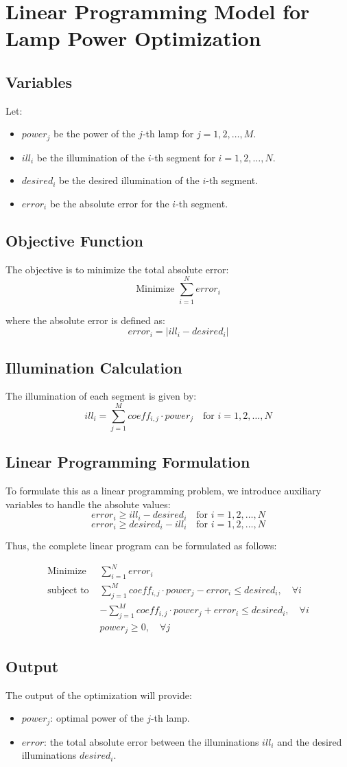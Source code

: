 \documentclass{article}
\begin{document}
\section*{Linear Programming Model for Lamp Power Optimization}

\subsection*{Variables}
Let:
\begin{itemize}
    \item $power_j$ be the power of the $j$-th lamp for $j = 1, 2, \ldots, M$.
    \item $ill_i$ be the illumination of the $i$-th segment for $i = 1, 2, \ldots, N$.
    \item $desired_i$ be the desired illumination of the $i$-th segment.
    \item $error_i$ be the absolute error for the $i$-th segment.
\end{itemize}

\subsection*{Objective Function}
The objective is to minimize the total absolute error:
\[
\text{Minimize } \sum_{i=1}^{N} error_i
\]

where the absolute error is defined as:
\[
error_i = |ill_i - desired_i|
\]

\subsection*{Illumination Calculation}
The illumination of each segment is given by:
\[
ill_i = \sum_{j=1}^{M} coeff_{i,j} \cdot power_j \quad \text{for } i = 1, 2, \ldots, N
\]

\subsection*{Linear Programming Formulation}
To formulate this as a linear programming problem, we introduce auxiliary variables to handle the absolute values:
\[
error_i \geq ill_i - desired_i \quad \text{for } i = 1, 2, \ldots, N
\]
\[
error_i \geq desired_i - ill_i \quad \text{for } i = 1, 2, \ldots, N
\]

Thus, the complete linear program can be formulated as follows:

\begin{align*}
\text{Minimize } & \sum_{i=1}^{N} error_i \\
\text{subject to } & \sum_{j=1}^{M} coeff_{i,j} \cdot power_j - error_i \leq desired_i, \quad \forall i \\
& -\sum_{j=1}^{M} coeff_{i,j} \cdot power_j + error_i \leq desired_i, \quad \forall i \\
& power_j \geq 0, \quad \forall j
\end{align*}

\subsection*{Output}
The output of the optimization will provide:
\begin{itemize}
    \item $power_j$: optimal power of the $j$-th lamp.
    \item $error$: the total absolute error between the illuminations $ill_i$ and the desired illuminations $desired_i$.
\end{itemize}
\end{document}

